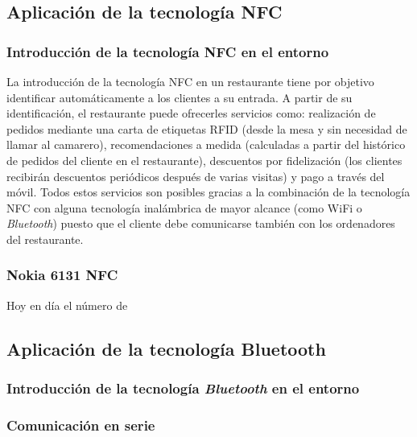   \subsection{Aplicación de la tecnología \acs{NFC}}
    \subsubsection{Introducción de la tecnología \acs{NFC} en el entorno}
  La introducción de la tecnología \acs{NFC} en un restaurante tiene por
  objetivo identificar automáticamente a los clientes a su entrada. A partir de
  su identificación, el restaurante puede ofrecerles servicios como:
  realización de pedidos mediante una carta de etiquetas \acs{RFID} (desde la
  mesa y sin necesidad de llamar al camarero), recomendaciones a medida
  (calculadas a partir del histórico de pedidos del cliente en el restaurante),
  descuentos por fidelización (los clientes recibirán descuentos periódicos
  después   de varias visitas) y pago a través del móvil. Todos estos servicios
  son posibles gracias a la combinación de la tecnología \acs{NFC} con alguna
  tecnología inalámbrica de mayor alcance (como \acs{WiFi} o \emph{Bluetooth})
  puesto que el cliente debe comunicarse también con los ordenadores del
  restaurante.
  
    \subsubsection{Nokia 6131 \acs{NFC}}
  Hoy en día el número de


  \subsection{Aplicación de la tecnología Bluetooth}
    \subsubsection{Introducción de la tecnología \emph{Bluetooth} en el
  entorno}
    \subsubsection{Comunicación en serie}

